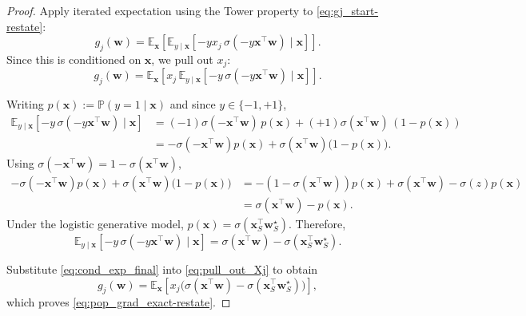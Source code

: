 \documentclass{article}
\theoremstyle{plain}
\theoremstyle{definition}
\theoremstyle{remark}
\begin{document}
{\begin{proof}
Apply iterated expectation using the Tower property to \eqref{eq:gj_start-restate}:
\[
g_j(\boldsymbol w)
=
\mathbb E_{\boldsymbol x}\!\left[
\mathbb E_{y\mid \boldsymbol x}\!\left[-y x_j\,\sigma(-y\boldsymbol x^\top \boldsymbol w)\mid \boldsymbol x\right]
\right].
\]
Since this is conditioned on $\boldsymbol x$, we pull out $x_{j}$:
\begin{equation}
\label{eq:pull_out_Xj}
g_j(\boldsymbol w)
=
\mathbb E_{\boldsymbol x}\!\left[
x_j\,
\mathbb E_{y\mid \boldsymbol x}\!\left[-y\,\sigma(-y\boldsymbol x^\top \boldsymbol w)\mid \boldsymbol x\right]
\right].
\end{equation}

Writing $p(\boldsymbol x):=\mathbb P(y=1\mid \boldsymbol x)$ and since $y\in\{-1,+1\}$,
\begin{align}
\mathbb E_{y\mid \boldsymbol x}\!\left[-y\,\sigma(-y \boldsymbol x^\top \boldsymbol w)\mid \boldsymbol x\right]
&=
(-1)\sigma(-\boldsymbol x^\top \boldsymbol w)\,p(\boldsymbol x)
+
(+1)\sigma(\boldsymbol x^\top \boldsymbol w)\,(1-p(\boldsymbol x)) \nonumber\\
&=
-\sigma(-\boldsymbol x^\top \boldsymbol w)p(\boldsymbol x)+\sigma(\boldsymbol x^\top \boldsymbol w)\big(1-p(\boldsymbol x)\big).
\label{eq:cond_exp_raw}
\end{align}
Using $\sigma(-\boldsymbol x^\top \boldsymbol w)=1-\sigma(\boldsymbol x^\top \boldsymbol w)$,
\begin{align}
-\sigma(-\boldsymbol x^\top \boldsymbol w)p(\boldsymbol x)+\sigma(\boldsymbol x^\top \boldsymbol w)\big(1-p(\boldsymbol x)\big)
&=
-(1-\sigma(\boldsymbol x^\top \boldsymbol w))p(\boldsymbol x)+\sigma(\boldsymbol x^\top \boldsymbol w)-\sigma(z)p(\boldsymbol x) \nonumber\\
&=
\sigma(\boldsymbol x^\top \boldsymbol w)-p(\boldsymbol x).
\label{eq:cond_exp_simplified}
\end{align}
Under the logistic generative model, $p(\boldsymbol x)=\sigma(\boldsymbol x_S^\top \boldsymbol w_S^\star)$.
Therefore,
\begin{equation}
\label{eq:cond_exp_final}
\mathbb E_{y\mid \boldsymbol x}\!\left[-y\,\sigma(-y\boldsymbol x^\top \boldsymbol w)\mid \boldsymbol x\right]
=
\sigma(\boldsymbol x^\top \boldsymbol w)-\sigma(\boldsymbol x_S^\top \boldsymbol w_S^\star).
\end{equation}


Substitute \eqref{eq:cond_exp_final} into \eqref{eq:pull_out_Xj} to obtain
\[
\label{exact_pop_grad}
g_j(\boldsymbol w)
=
\mathbb E_{\boldsymbol x}\!\left[
x_j\Big(\sigma(\boldsymbol x^\top \boldsymbol w)-\sigma(\boldsymbol x_S^\top \boldsymbol w_S^\star)\Big)
\right],
\]
which proves \eqref{eq:pop_grad_exact-restate}.


\end{proof}}
\end{document}
